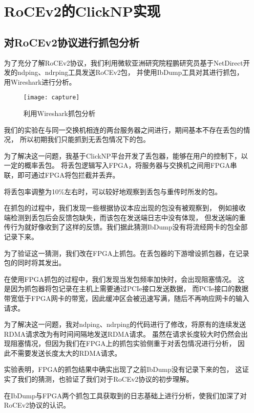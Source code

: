 \chapter{RoCEv2的ClickNP实现}
\section{对RoCEv2协议进行抓包分析}
为了充分了解RoCEv2协议，我们利用微软亚洲研究院程鹏研究员基于NetDirect开发的ndping、ndrping工具发送RoCEv2包，
并使用IbDump工具对其进行抓包，用Wireshark进行分析。
\begin{figure}[htbp]
\centering
\texttt{[image: capture]}
\caption{利用Wireshark抓包分析}\label{fig:capture}
\end{figure}



我们的实验在与同一交换机相连的两台服务器之间进行，期间基本不存在丢包的情况，
所以初期我们只能抓到无丢包情况下的包。

为了解决这一问题，我基于ClickNP平台开发了丢包器，能够在用户的控制下，以一定的概率丢包。
将丢包逻辑写入FPGA，将服务器与交换机之间用FPGA串联，即可通过FPGA将包拦截并丢弃。

将丢包率调整为10\%左右时，可以较好地观察到丢包与重传时所发的包。

在抓包的过程中，我们发现一些根据协议本应出现的包没有被观察到，
例如接收端检测到丢包后会反馈包缺失，而该包在发送端日志中没有体现，
但发送端的重传行为就好像收到了这样的反馈。我们据此猜测IbDump没有将流经网卡的包全部记录下来。

为了验证这一猜测，我们改在FPGA上抓包。在丢包器的下游增设抓包器，在记录包的同时将其发出。

在使用FPGA抓包的过程中，我们发现当发包频率加快时，会出现阻塞情况。
这是因为抓包器将包记录在主机上需要通过PCIe接口发送数据，
而PCIe接口的数据带宽低于FPGA网卡的带宽，因此缓冲区会被迅速写满，随后不再响应网卡的输入请求。

为了解决这一问题，我对ndping、ndrping的代码进行了修改，将原有的连续发送RDMA请求改为有时间间隔地发送RDMA请求。
虽然在请求长度较大时仍然会出现阻塞情况，但因为我们在FPGA上的抓包实验侧重于对丢包情况进行分析，
因此不需要发送长度太大的RDMA请求。

实验表明，FPGA的抓包结果中确实出现了之前IbDump没有记录下来的包，
这证实了我们的猜测，也验证了我们对于RoCEv2协议的初步理解。

在IbDump与FPGA两个抓包工具获取到的日志基础上进行分析，使我们加深了对RoCEv2协议的认识。

